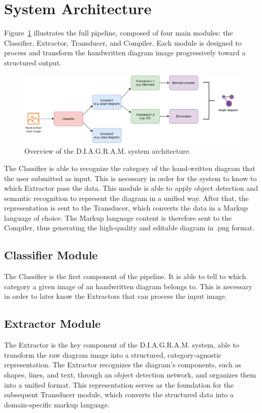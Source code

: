 \documentclass[conference]{IEEEtran}
\begin{document}
\section{System Architecture}
Figure~\ref{fig:pipeline} illustrates the full pipeline, composed of four main modules: the Classifier, Extractor, Transducer, and Compiler. Each module is designed to process and transform the handwritten diagram image progressively toward a structured output.

\begin{figure}[H]
\centering
\includegraphics[width=\linewidth]{overview.png}
\caption{Overview of the D.I.A.G.R.A.M. system architecture.}
\label{fig:pipeline}
\end{figure}

The Classifier is able to recognize the category of the hand-written diagram that the user submitted as input. This is necessary in order for the system to know to which Extractor pass the data. This module is able to apply object detection and semantic recognition to represent the diagram in a unified way. After that, the representation is sent to the Transducer, which converts the data in a Markup language of choice. The Markup language content is therefore sent to the Compiler, thus generating the high-quality and editable diagram in .png format.

\subsection{Classifier Module}
The Classifier is the first component of the pipeline. It is able to tell to which category a given image of an handwritten diagram belongs to. This is necessary in order to later know the Extractors that can process the input image.
\subsection{Extractor Module}
The Extractor is the key component of the D.I.A.G.R.A.M. system, able to transform the raw diagram image into a structured, category-agnostic representation.
The Extractor recognizes the diagram's components, such as shapes, lines, and text, through an object detection network, and organizes them into a unified format. This representation serves as the foundation for the subsequent Transducer module, which converts the structured data into a domain-specific markup language.
\end{document}
